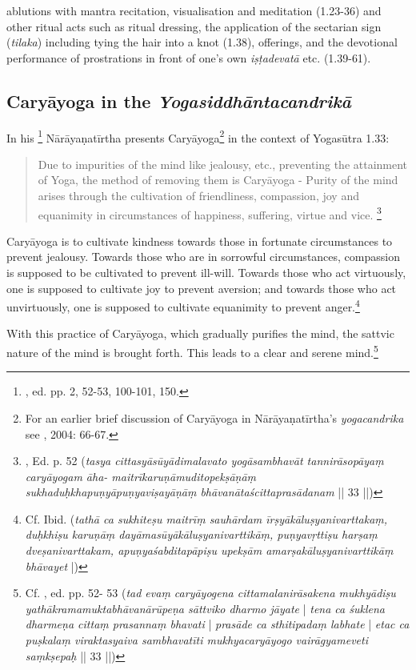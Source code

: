 ablutions with mantra recitation, visualisation and meditation (1.23-36) and other ritual acts such as ritual dressing, the application of the sectarian sign (\textit{tilaka}) including tying the hair into a knot (1.38), offerings, and the devotional performance of prostrations in front of one's own \textit{iṣṭadevatā} etc. (1.39-61).               

\subsection{Caryāyoga in the \textit{Yogasiddhāntacandrikā}}

In his \footnote{, ed. pp. 2, 52-53, 100-101, 150.} Nārāyaṇatīrtha presents Caryāyoga\footnote{For an earlier brief discussion of Caryāyoga in Nārāyaṇatīrtha's \textit{yogacandrika} see \citeauthor{penna2004}, 2004: 66-67.} in the context of Yogasūtra 1.33:

\begin{quote}
  Due to impurities of the mind like jealousy, etc., preventing the attainment of Yoga, the method of removing them is Caryāyoga - Purity of the mind arises through the cultivation of friendliness, compassion, joy and equanimity in circumstances of happiness, suffering, virtue and vice. \footnote{, Ed. p. 52 (\textit{tasya cittasyāsūyādimalavato yogāsambhavāt tannirāsopāyaṃ caryāyogam āha- maitrīkaruṇāmuditopekṣāṇāṃ sukhaduḥkhapuṇyāpuṇyaviṣayāṇāṃ bhāvanātaścittaprasādanam} || 33 ||)} 
  \end{quote}
  
Caryāyoga is to cultivate kindness towards those in fortunate circumstances to prevent jealousy. Towards those who are in sorrowful circumstances, compassion is supposed to be cultivated to prevent ill-will. Towards those who act virtuously, one is supposed to cultivate joy to prevent aversion; and towards those who act unvirtuously, one is supposed to cultivate equanimity to prevent anger.\footnote{Cf. Ibid. (\textit{tathā ca sukhiteṣu maitrīṃ sauhārdam īrṣyākāluṣyanivarttakaṃ, duḥkhiṣu karuṇāṃ dayāmasūyākāluṣyanivarttikāṃ, puṇyavṛttiṣu harṣaṃ dveṣanivarttakam, apuṇyaśabditapāpiṣu upekṣām amarṣakāluṣyanivarttikāṃ bhāvayet} |)}        

 With this practice of Caryāyoga, which gradually purifies the mind, the sattvic nature of the mind is brought forth. This leads to a clear and serene mind.\footnote{Cf. , ed. pp. 52- 53 (\textit{tad evaṃ caryāyogena cittamalanirāsakena mukhyādiṣu yathākramamuktabhāvanārūpeṇa sāttviko dharmo jāyate} | \textit{tena ca śuklena dharmeṇa cittaṃ prasannaṃ bhavati} | \textit{prasāde ca sthitipadaṃ labhate} | \textit{etac ca puṣkalaṃ viraktasyaiva sambhavatīti mukhyacaryāyogo vairāgyameveti saṃkṣepaḥ} || 33 ||)}

